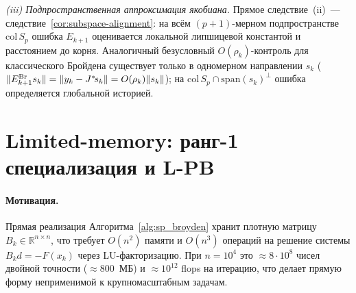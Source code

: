 \begin{remark}
\smallskip
\noindent\textit{(iii) Подпространственная аппроксимация якобиана.}
Прямое следствие~(ii)~--- следствие~\ref{cor:subspace-alignment}: на
всём $(p{+}1)$-мерном подпространстве $\mathrm{col}\,S_p$ ошибка $E_{k+1}$
оценивается локальной липшицевой константой и расстоянием до корня.
Аналогичный безусловный $O(\rho_k)$-контроль для классического Бройдена
существует только в одномерном направлении $s_k$
($\|E_{k+1}^{\mathrm{Br}} s_k\| = \|y_k - J^{*}\!s_k\| = O(\rho_k)\|s_k\|$);
на $\mathrm{col}\,S_p\cap\mathrm{span}(s_k)^\perp$ ошибка определяется
глобальной историей.
\end{remark}




\section{Limited-memory: ранг-1 специализация и L-PB}\label{sec:highdim}

\paragraph{Мотивация.} Прямая реализация Алгоритма~\ref{alg:sp_broyden}
хранит плотную матрицу $B_k\in\mathbb R^{n\times n}$, что требует
$O(n^2)$ памяти и $O(n^3)$ операций на решение системы $B_k d = -F(x_k)$
через LU-факторизацию. При $n=10^4$ это $\approx 8\cdot 10^8$ чисел
двойной точности ($\approx 800$~МБ) и $\approx 10^{12}$ flops на
итерацию, что делает прямую форму неприменимой к крупномасштабным
задачам.

